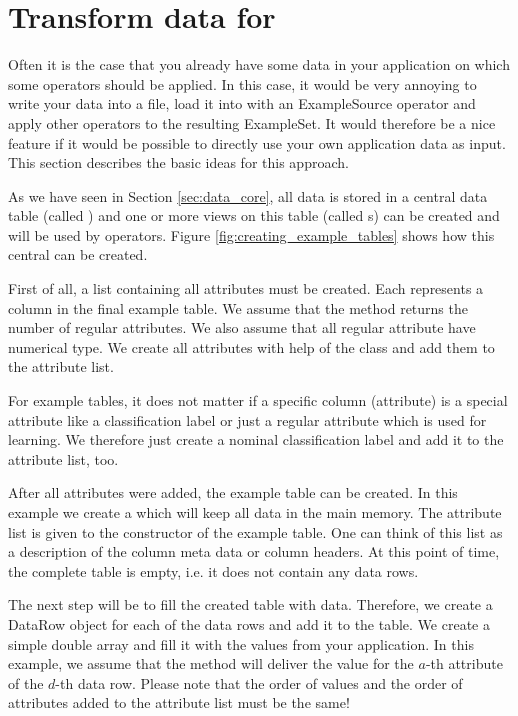 \section{Transform data for \rapidminer}

Often it is the case that you already have some data in your application on which 
some operators should be applied. In this case, it would be very annoying to write
your data into a file, load it into \rapidminer with an ExampleSource operator and apply
other operators to the resulting ExampleSet. It would therefore be a nice feature
if it would be possible to directly use your own application data as input. 
This section describes the basic ideas for this approach.

As we have seen in Section \ref{sec:data_core}, all data is stored in a central data 
table (called ) and one or more views on this table (called s) 
can be created and will be used by operators. Figure \ref{fig:creating_example_tables} 
shows how this central  can be created. 


First of all, a list containing
all attributes must be created. Each  represents a column in the final example 
table. We assume that the method  returns the number of regular 
attributes. We also assume that all regular attribute have numerical type. We create
all attributes with help of the class  and add them to the attribute list. 

For example tables, it does not matter if a specific column (attribute) is a 
special attribute like a classification label or just a regular attribute which is used
for learning. We therefore just create a nominal classification label and add it to
the attribute list, too.

After all attributes were added, the example table can be created. In this example we create a 
 which will keep all data in the main memory. The attribute list is given
to the constructor of the example table. One can think of this list as a description of the
column meta data or column headers. At this point of time, the complete table is empty, i.e.
it does not contain any data rows.

The next step will be to fill the created table with data. Therefore, we create a DataRow 
object for each of the  data rows and add it to the table. 
We create a simple double array
and fill it with the values from your application. In this example, we assume that the method
 will deliver the value for the $a$-th attribute of the $d$-th data row.
Please note that the order of values and the order of attributes added to the attribute list
must be the same!

